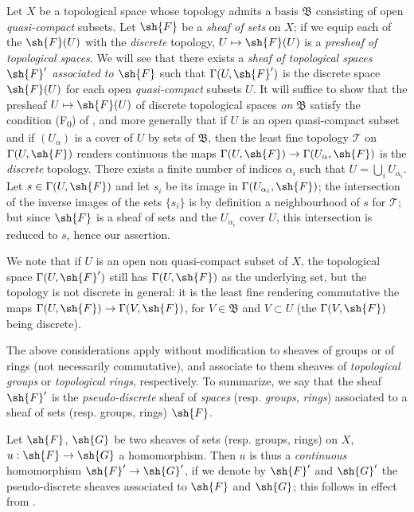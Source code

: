 \begin{env}[3.8.1]
\label{0.3.8.1}
Let $X$ be a topological space whose topology admits a basis $\mathfrak{B}$
consisting of open \emph{quasi-compact} subsets. Let $\sh{F}$ be a \emph{sheaf
of sets} on $X$; if we equip each of the $\sh{F}(U)$ with the \emph{discrete}
topology, $U\mapsto\sh{F}(U)$ is a \emph{presheaf of topological spaces}. We
will see that there exists a \emph{sheaf of topological spaces $\sh{F}'$
associated to $\sh{F}$}  such that $\Gamma(U,\sh{F}')$ is the
discrete space $\sh{F}(U)$ for each open \emph{quasi-compact} subsets $U$. It
will suffice to show that the presheaf $U\mapsto\sh{F}(U)$ of discrete
topological spaces \emph{on $\mathfrak{B}$} satisfy the condition (F\textsubscript{0}) of
, and more generally that if $U$ is an open quasi-compact
subset and if $(U_\alpha)$ is a cover of $U$ by sets of $\mathfrak{B}$, then the
least fine topology $\mathcal{T}$ on $\Gamma(U,\sh{F})$ renders continuous the
maps $\Gamma(U,\sh{F})\to\Gamma(U_\alpha,\sh{F})$ is the \emph{discrete}
topology. There exists a finite number of indices $\alpha_i$ such that
$U=\bigcup_i U_{\alpha_i}$. Let $s\in\Gamma(U,\sh{F})$ and let $s_i$ be its
image in $\Gamma(U_{\alpha_i},\sh{F})$; the intersection of the inverse images
of the sets $\{s_i\}$ is by definition a neighbourhood of $s$ for $\mathcal{T}$;
but since $\sh{F}$ is a sheaf of sets and the $U_{\alpha_i}$ cover $U$, this
intersection is reduced to $s$, hence our assertion.

We note that if $U$ is an open non quasi-compact subset of $X$, the topological
space $\Gamma(U,\sh{F}')$ still has $\Gamma(U,\sh{F})$ as the underlying set,
but the topology is not discrete in general: it is the least fine rendering
commutative the maps $\Gamma(U,\sh{F})\to\Gamma(V,\sh{F})$, for
$V\in\mathfrak{B}$ and $V\subset U$ (the $\Gamma(V,\sh{F})$ being discrete).

The above considerations apply without modification to sheaves of groups or of
rings (not necessarily commutative), and associate to them sheaves of
\emph{topological groups} or \emph{topological rings}, respectively. To
summarize, we say that the sheaf $\sh{F}'$ is the \emph{pseudo-discrete} sheaf
of \emph{spaces} (resp. \emph{groups}, \emph{rings}) associated to a sheaf of
sets (resp. groups, rings) $\sh{F}$.
\end{env}

\begin{env}[3.8.2]
\label{0.3.8.2}
Let $\sh{F}$, $\sh{G}$ be two sheaves of sets (resp. groups, rings) on $X$,
$u:\sh{F}\to\sh{G}$ a homomorphism. Then $u$ is thus a \emph{continuous}
homomorphism $\sh{F}'\to\sh{G}'$, if we denote by $\sh{F}'$ and $\sh{G}'$ the
pseudo-discrete sheaves associated to $\sh{F}$ and $\sh{G}$; this follows in
effect from .
\end{env}

